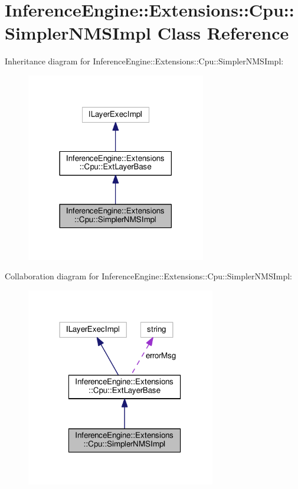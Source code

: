 \hypertarget{classInferenceEngine_1_1Extensions_1_1Cpu_1_1SimplerNMSImpl}{}\section{Inference\+Engine\+:\+:Extensions\+:\+:Cpu\+:\+:Simpler\+N\+M\+S\+Impl Class Reference}
\label{classInferenceEngine_1_1Extensions_1_1Cpu_1_1SimplerNMSImpl}


Inheritance diagram for Inference\+Engine\+:\+:Extensions\+:\+:Cpu\+:\+:Simpler\+N\+M\+S\+Impl\+:
\nopagebreak
\begin{figure}[H]
\begin{center}
\leavevmode
\includegraphics[width=222pt]{classInferenceEngine_1_1Extensions_1_1Cpu_1_1SimplerNMSImpl__inherit__graph}
\end{center}
\end{figure}


Collaboration diagram for Inference\+Engine\+:\+:Extensions\+:\+:Cpu\+:\+:Simpler\+N\+M\+S\+Impl\+:
\nopagebreak
\begin{figure}[H]
\begin{center}
\leavevmode
\includegraphics[width=234pt]{classInferenceEngine_1_1Extensions_1_1Cpu_1_1SimplerNMSImpl__coll__graph}
\end{center}
\end{figure}
